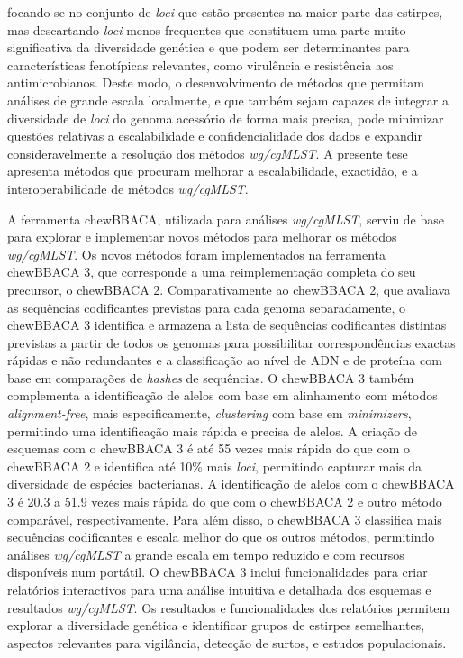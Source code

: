 focando-se no conjunto de \textit{loci} que estão presentes na maior parte das estirpes, mas descartando \textit{loci} menos frequentes que constituem uma parte muito significativa da diversidade genética e que podem ser determinantes para características fenotípicas relevantes, como virulência e resistência aos antimicrobianos. Deste modo, o desenvolvimento de métodos que permitam análises de grande escala localmente, e que também sejam capazes de integrar a diversidade de \textit{loci} do genoma acessório de forma mais precisa, pode minimizar questões relativas a escalabilidade e confidencialidade dos dados e expandir consideravelmente a resolução dos métodos \textit{wg/cgMLST}. A presente tese apresenta métodos que procuram melhorar a escalabilidade, exactidão, e a interoperabilidade de métodos \textit{wg/cgMLST}.

A ferramenta chewBBACA, utilizada para análises \textit{wg/cgMLST}, serviu de base para explorar e implementar novos métodos para melhorar os métodos \textit{wg/cgMLST}. Os novos métodos foram implementados na ferramenta chewBBACA 3, que corresponde a uma reimplementação completa do seu precursor, o chewBBACA 2. Comparativamente ao chewBBACA 2, que avaliava as sequências codificantes previstas para cada genoma separadamente, o chewBBACA 3 identifica e armazena a lista de sequências codificantes distintas previstas a partir de todos os genomas para possibilitar correspondências exactas rápidas e não redundantes e a classificação ao nível de ADN e de proteína com base em comparações de \textit{hashes} de sequências. O chewBBACA 3 também complementa a identificação de alelos com base em alinhamento com métodos \textit{alignment-free}, mais especificamente, \textit{clustering} com base em \textit{minimizers}, permitindo uma identificação mais rápida e precisa de alelos. A criação de esquemas com o chewBBACA 3 é até 55 vezes mais rápida do que com o chewBBACA 2 e identifica até 10\% mais \textit{loci}, permitindo capturar mais da diversidade de espécies bacterianas. A identificação de alelos com o chewBBACA 3 é 20.3 a 51.9 vezes mais rápida do que com o chewBBACA 2 e outro método comparável, respectivamente. Para além disso, o chewBBACA 3 classifica mais sequências codificantes e escala melhor do que os outros métodos, permitindo análises \textit{wg/cgMLST} a grande escala em tempo reduzido e com recursos disponíveis num portátil. O chewBBACA 3 inclui funcionalidades para criar relatórios interactivos para uma análise intuitiva e detalhada dos esquemas e resultados \textit{wg/cgMLST}. Os resultados e funcionalidades dos relatórios permitem explorar a diversidade genética e identificar grupos de estirpes semelhantes, aspectos relevantes para vigilância, detecção de surtos, e estudos populacionais.

